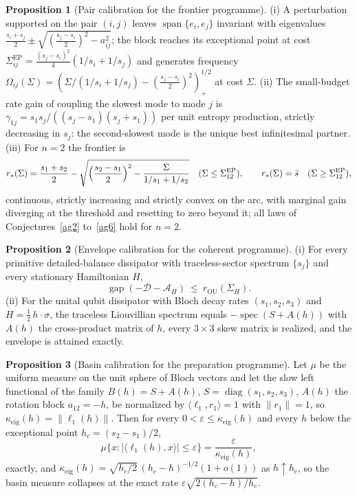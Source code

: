 \documentclass[11pt]{article}
\theoremstyle{definition}
\newcommand{\eps}{\varepsilon}
\newtheorem{proposition}{Proposition}
\begin{document}
\begin{proposition}[Pair calibration for the frontier programme]\label{ag:pair}
(i) A perturbation supported on the pair $(i,j)$ leaves $\operatorname{span}\{e_i,e_j\}$ invariant with eigenvalues $\tfrac{s_i+s_j}2\pm\sqrt{(\tfrac{s_j-s_i}2)^2-a_{ij}^2}$; the block reaches its exceptional point at cost $\Sigma_{ij}^{\mathrm{EP}}=\tfrac{(s_j-s_i)^2}4(1/s_i+1/s_j)$ and generates frequency $\Omega_{ij}(\Sigma)=(\Sigma/(1/s_i+1/s_j)-(\tfrac{s_j-s_i}2)^2)_+^{1/2}$ at cost $\Sigma$.  (ii) The small-budget rate gain of coupling the slowest mode to mode $j$ is $\gamma_{1j}=s_1s_j/((s_j-s_1)(s_j+s_1))$ per unit entropy production, strictly decreasing in $s_j$: the second-slowest mode is the unique best infinitesimal partner.  (iii) For $n=2$ the frontier is
\[
r_*(\Sigma)=\frac{s_1+s_2}2-\sqrt{\Bigl(\frac{s_2-s_1}2\Bigr)^2-\frac{\Sigma}{1/s_1+1/s_2}}
\quad(\Sigma\le\Sigma_{12}^{\mathrm{EP}}),\qquad r_*(\Sigma)=\bar s\quad(\Sigma\ge\Sigma_{12}^{\mathrm{EP}}),
\]
continuous, strictly increasing and strictly convex on the arc, with marginal gain diverging at the threshold and resetting to zero beyond it; all laws of Conjectures~\ref{ag2} to~\ref{ag6} hold for $n=2$.
\end{proposition}

\begin{proposition}[Envelope calibration for the coherent programme]\label{ag:env}
(i) For every primitive detailed-balance dissipator with traceless-sector spectrum $\{s_j\}$ and every stationary Hamiltonian $H$,
\[
\operatorname{gap}(-\mathcal D-\mathcal A_H)\ \le\ r_{\mathrm{OU}}(\Sigma_H).
\]
(ii) For the unital qubit dissipator with Bloch decay rates $(s_1,s_2,s_3)$ and $H=\tfrac12\,h\cdot\sigma$, the traceless Liouvillian spectrum equals $-\operatorname{spec}(S+A(h))$ with $A(h)$ the cross-product matrix of $h$, every $3\times3$ skew matrix is realized, and the envelope is attained exactly.
\end{proposition}

\begin{proposition}[Basin calibration for the preparation programme]\label{ag:basin}
Let $\mu$ be the uniform measure on the unit sphere of Bloch vectors and let the slow left functional of the family $B(h)=S+A(h)$, $S=\operatorname{diag}(s_1,s_2,s_3)$, $A(h)$ the rotation block $a_{12}=-h$, be normalized by $\langle\ell_1,r_1\rangle=1$ with $\|r_1\|=1$, so $\kappa_{\mathrm{eig}}(h)=\|\ell_1(h)\|$.  Then for every $0<\eps\le\kappa_{\mathrm{eig}}(h)$ and every $h$ below the exceptional point $h_c=(s_2-s_1)/2$,
\[
\mu\{x:|\langle\ell_1(h),x\rangle|\le\eps\}=\frac{\eps}{\kappa_{\mathrm{eig}}(h)},
\]
exactly, and $\kappa_{\mathrm{eig}}(h)=\sqrt{h_c/2}\,(h_c-h)^{-1/2}(1+o(1))$ as $h\uparrow h_c$, so the basin measure collapses at the exact rate $\eps\sqrt{2(h_c-h)/h_c}$.
\end{proposition}
\end{document}
